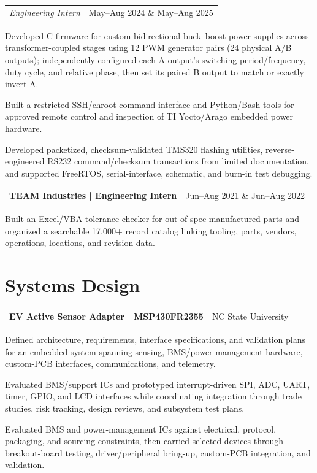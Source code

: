 \documentclass[10pt,letterpaper]{article}
\makeatletter
\newcommand{\resumeentry}[2]{%
  \begin{tabularx}{\textwidth}{@{}X>{\raggedleft\arraybackslash}p{2.50in}@{}}
    \textbf{#1} & #2
  \end{tabularx}\vspace{-0.06cm}
}
\newcommand{\roleentry}[2]{%
  \begin{tabularx}{\textwidth}{@{}X>{\raggedleft\arraybackslash}p{2.50in}@{}}
    \textit{#1} & #2
  \end{tabularx}\vspace{-0.06cm}
}
\makeatother
\begin{document}
\roleentry{Engineering Intern}{May--Aug 2024 \& May--Aug 2025}
\begin{resumebullets}
  \item Developed C firmware for custom bidirectional buck--boost power supplies across transformer-coupled stages using 12 PWM generator pairs (24 physical A/B outputs); independently configured each A output's switching period/frequency, duty cycle, and relative phase, then set its paired B output to match or exactly invert A.
  \item Built a restricted SSH/chroot command interface and Python/Bash tools for approved remote control and inspection of TI Yocto/Arago embedded power hardware.
  \item Developed packetized, checksum-validated TMS320 flashing utilities, reverse-engineered RS232 command/checksum transactions from limited documentation, and supported FreeRTOS, serial-interface, schematic, and burn-in test debugging.
\end{resumebullets}

\resumeentry{TEAM Industries | Engineering Intern}{Jun--Aug 2021 \& Jun--Aug 2022}
\begin{resumebullets}
  \item Built an Excel/VBA tolerance checker for out-of-spec manufactured parts and organized a searchable 17,000+ record catalog linking tooling, parts, vendors, operations, locations, and revision data.
\end{resumebullets}

\section{Systems Design}
\resumeentry{EV Active Sensor Adapter | MSP430FR2355}{NC State University}
\begin{resumebullets}
  \item Defined architecture, requirements, interface specifications, and validation plans for an embedded system spanning sensing, BMS/power-management hardware, custom-PCB interfaces, communications, and telemetry.
  \item Evaluated BMS/support ICs and prototyped interrupt-driven SPI, ADC, UART, timer, GPIO, and LCD interfaces while coordinating integration through trade studies, risk tracking, design reviews, and subsystem test plans.
  \item Evaluated BMS and power-management ICs against electrical, protocol, packaging, and sourcing constraints, then carried selected devices through breakout-board testing, driver/peripheral bring-up, custom-PCB integration, and validation.
\end{resumebullets}
\end{document}
